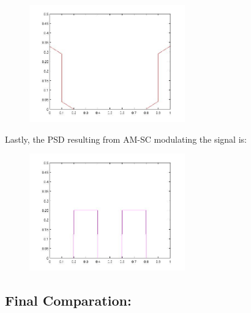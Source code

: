\documentclass[a4paper,11pt]{article}
\begin{document}
\begin{figure}[!hp]
    \begin{center}
    \includegraphics[width=0.6\textwidth]{images/lab3_redo_27.jpg}
    \end{center}
\end{figure}

\newpage

Lastly, the PSD resulting from AM-SC modulating the signal is:

\begin{figure}[!hp]
    \begin{center}
    \includegraphics[width=0.6\textwidth]{images/lab3_redo_28.jpg}
    \end{center}
\end{figure}

\subsection{Final Comparation:}
\end{document}
